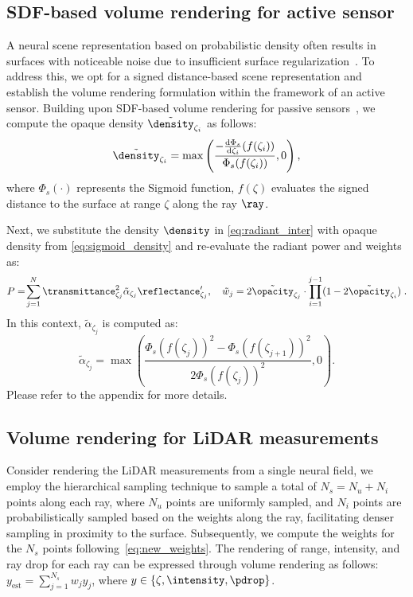\subsection{SDF-based volume rendering for active sensor} 
\label{sec:sdf_vol_render}
A neural scene representation based on probabilistic density often results in surfaces with noticeable noise due to insufficient surface regularization~\cite{wang2021neus}. To address this, we opt for a signed distance-based scene representation and establish the volume rendering formulation within the framework of an active sensor. Building upon SDF-based volume rendering for passive sensors~\cite{wang2021neus}, we compute the opaque density $\tilde{\density}_{\zeta_i}$ as follows:
\begin{equation}
\tilde{\density}_{\zeta_i} = \max\left(\frac{-\frac{{\textrm{d}}\Phi_s}{{\textrm{d}} \zeta_i}(f(\zeta_i))}{\Phi_s(f(\zeta_i))},0\right),
\label{eq:sigmoid_density}
\end{equation}
where $\Phi_s(\cdot)$ represents the Sigmoid function, $f(\zeta)$ evaluates the signed distance to the surface at range $\zeta$ along the ray $\ray$. 

Next, we substitute the density $\density$ in \cref{eq:radiant_inter} with opaque density from \cref{eq:sigmoid_density} and re-evaluate the radiant power and weights as:
\begin{equation}
      P
      =\!\sum_{j=1}^N \transmittance^2_{\zeta_j} \tilde{\alpha}_{\zeta_j} \reflectance_{\zeta_j}',\quad \tilde{w}_j = 2 \tilde{\opacity}_{\zeta_j} \cdot\prod_{i=1}^{j-1}(1 - 2 \tilde{\opacity}_{\zeta_i})\;.
\end{equation}
In this context, $\tilde{\alpha}_{\zeta_j}$ is computed as:
\begin{equation}
    \tilde{\alpha}_{\zeta_j} = \max\left(\!\frac{{\Phi_s(f(\zeta_j))}^2 -{\Phi_s(f(\zeta_{j+1}))}^2}{{2\Phi_s(f(\zeta_j))}^2},0\right).
    \label{eq:new_weights}
\end{equation}
Please refer to the appendix for more details.


\subsection{Volume rendering for LiDAR measurements}
\label{sec:dynamic_nfl_rendering}
Consider rendering the LiDAR measurements from a single neural field, we employ the hierarchical sampling\cite{wang2021neus} technique to sample a total of $N_s= N_u + N_i$ points along each ray, where $N_u$ points are uniformly sampled, and $N_i$ points are probabilistically sampled based on the weights along the ray, facilitating denser sampling in proximity to the surface. Subsequently, we compute the weights for the $N_s$ points following~\cref{eq:new_weights}. The rendering of range, intensity, and ray drop for each ray can be expressed through volume rendering as follows: $y_\text{est} = \sum_{j=1}^{N_s} w_j y_j$, where $y \in \{\zeta, \intensity, \pdrop\}$.


